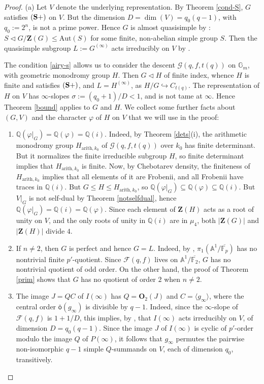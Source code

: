 \documentclass[11pt]{amsart}
\theoremstyle{plain}
\theoremstyle{definition}
\numberwithin{thm}{section}
\numberwithin{equation}{thm}
\newcommand{\inj}{\hookrightarrow}
\newcommand{\Aut}{\mathrm{Aut}}
\newcommand{\sF}{{\mathcal F}}
\newcommand{\sG}{{\mathcal G}}
\newcommand{\A}{{\mathbb A}}
\newcommand{\F}{{\mathbb F}}
\newcommand{\G}{{\mathbb G}}
\newcommand{\Q}{{\mathbb Q}}
\newcommand{\0}{\emptyset}
\newcommand{\ZB}{{\mathbf Z}}
\newcommand{\OB}{{\mathbf O}}
\newcommand{\ari}{{\mathrm {arith}}}
\newcommand{\CSP}{\mathrm {({\bf S+})}}
\newcommand{\obar}{\bar{\mathsf o}}
\begin{document}
\begin{proof}
(a) Let $V$ denote the underlying representation. By Theorem \ref{cond-S}, $G$ satisfies $\CSP$ on $V$. But the dimension
$D=\dim(V)=q_0(q-1)$, with $q_0:=2^n$, is not a prime power. Hence $G$ is almost quasisimple by \cite[Lemma 1.1]{KT5}:
$S \lhd G/\ZB(G) \leq \Aut(S)$ for some finite, non-abelian simple group $S$. 
Then the quasisimple subgroup $L:=G^{(\infty)}$ acts irreducibly on $V$ by \cite[Lemma 1.4]{KT5}. 

The condition \eqref{airy-s} allows us to consider the descent $\sG(q,f,t(q))$ on $\G_m$, with geometric monodromy group
$H$. Then $G \lhd H$ of finite index, whence $H$ is finite and satisfies $\CSP$, and $L=H^{(\infty)}$, 
as $H/G \inj C_{t(q)}$. The representation of $H$ on $V$ has $\infty$-slopes $\sigma:= (q_0+1)/D <1$, and
is not tame at $\infty$. Hence Theorem \ref{bound} applies to $G$ and $H$.
We collect some further facts about $(G,V)$ and the character $\varphi$ of $H$ on $V$ that we will use in the proof:

\begin{enumerate}[\rm(i)]
\item $\Q(\varphi|_G) = \Q(\varphi)=\Q(i)$. 
Indeed, by Theorem \ref{dets}(i), the arithmetic monodromy group $H_{\ari,k_0}$ of $\sG(q,f,t(q))$ 
over $k_0$ has finite determinant. But it normalizes the finite irreducible subgroup $H$, so finite determinant implies that $H_{\ari,k_0}$ is 
finite. Now, by Chebotarev density, the finiteness of $H_{\ari,k_0}$ implies that all elements of it are Frobenii, and   
all Frobenii have traces in $\Q(i)$. But $G \leq H \leq H_{\ari,k_0}$, so
$\Q(\varphi|_G) \subseteq \Q(\varphi) \subseteq \Q(i)$. 
But $V|_G$ is not self-dual by Theorem \ref{notselfdual}, hence $\Q(\varphi|_G)=\Q(i) = \Q(\varphi)$. Since 
each element of $\ZB(H)$ acts as a root of unity on $V$, and the only roots of unity in $\Q(i)$ are in $\mu_4$, 
both $|\ZB(G)|$ and $|\ZB(H)|$ divide $4$. 
\item If $n \neq 2$, then $G$ is perfect and hence $G=L$. 
Indeed, by \cite[Proposition 6]{Abh}, $\pi_1(\A^1/\overline{\F_p})$ has no nontrivial finite $p'$-quotient. Since $\sF(q,f)$ lives on $\A^1/\overline{\F_2}$, $G$ has no nontrivial quotient of odd order. 
On the other hand, the proof
of Theorem \ref{prim} shows that $G$ has no quotient of order $2$ when $n \neq 2$.
\item The image $J = QC$ of $I(\infty)$ has $Q = \OB_2(J)$ and $C = \langle g_\infty \rangle$, where the central order 
$\obar(g_\infty)$ is divisible by $q-1$. Indeed, since the $\infty$-slope of $\sF(q,f)$ is $1+1/D$, this implies, by
\cite[Proposition 1.14]{Ka-GKM}, that 
$I(\infty)$ acts irreducibly on $V$, of dimension $D=q_0(q-1)$. Since the image $J$ of $I(\infty)$ is cyclic of $p'$-order modulo 
the image $Q$ of $P(\infty)$, it follows that
$g_\infty$ permutes the pairwise non-isomorphic $q-1$ simple $Q$-summands on $V$, each of dimension $q_0$, transitively. 
\end{enumerate}



\end{proof}
\end{document}
